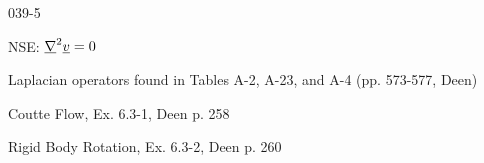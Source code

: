 \begin{mitframe}{039-5}

            
\begin{listone}

\item NSE: $\gradop^2\uline{\vvel}=0$

\item Laplacian operators found in Tables A-2, A-23, and A-4 (pp. 573-577, Deen)

\item Coutte Flow, Ex. 6.3-1, Deen p. 258

\item Rigid Body Rotation, Ex. 6.3-2, Deen p. 260
\end{listone}

\end{mitframe}